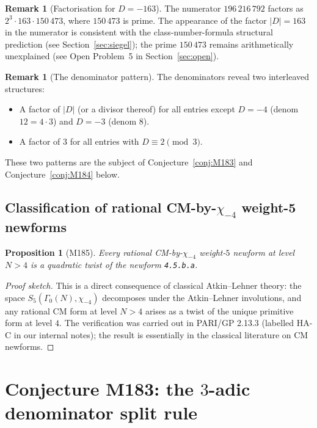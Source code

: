 \documentclass[12pt]{amsart}
\newtheorem{proposition}[theorem]{Proposition}
\theoremstyle{definition}
\newtheorem{remark}[theorem]{Remark}
\begin{document}
\begin{remark}[Factorisation for $D = -163$]
  The numerator $196\,216\,792$ factors as $2^3 \cdot 163 \cdot 150\,473$,
  where $150\,473$ is prime.
  The appearance of the factor $|D| = 163$ in the numerator is consistent
  with the class-number-formula structural prediction (see
  Section~\ref{sec:siegel}); the prime $150\,473$ remains arithmetically
  unexplained (see Open Problem~5 in Section~\ref{sec:open}).
\end{remark}

\begin{remark}[The denominator pattern]
  The denominators reveal two interleaved structures:
  \begin{itemize}
    \item A factor of $|D|$ (or a divisor thereof) for all entries except
      $D=-4$ (denom $12 = 4 \cdot 3$) and $D=-3$ (denom $8$).
    \item A factor of $3$ for all entries with $D \equiv 2 \pmod 3$.
  \end{itemize}
  These two patterns are the subject of Conjecture~\ref{conj:M183} and
  Conjecture~\ref{conj:M184} below.
\end{remark}

\subsection{Classification of rational CM-by-\texorpdfstring{$\chi_{-4}$}{chi\_-4} weight-5 newforms}

\begin{proposition}[M185]
  \label{prop:M185}
  Every rational CM-by-$\chi_{-4}$ weight-$5$ newform at level $N > 4$
  is a quadratic twist of the newform \texttt{4.5.b.a}.
\end{proposition}

\begin{proof}[Proof sketch]
  This is a direct consequence of classical Atkin--Lehner theory: the space
  $S_5(\Gamma_0(N), \chi_{-4})$ decomposes under the Atkin--Lehner involutions,
  and any rational CM form at level $N > 4$ arises as a twist of the unique
  primitive form at level $4$.
  The verification was carried out in PARI/GP 2.13.3 (labelled HA-C in our
  internal notes); the result is essentially in the classical literature on CM
  newforms.
\end{proof}

\section{Conjecture M183: the $3$-adic denominator split rule}
\label{sec:M183}
\end{document}
